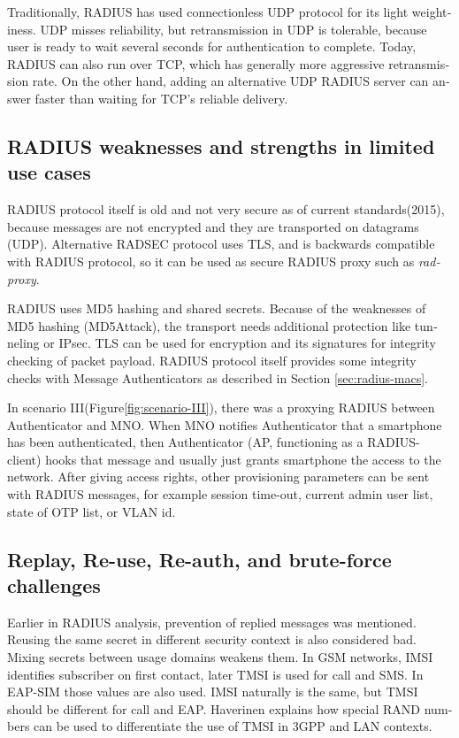 \documentclass[12pt,a4paper,english]{tutthesis}
\begin{document}
\begin{otherlanguage}{english}
Traditionally, RADIUS has used connection\-less UDP protocol for its
light weightiness. UDP misses reliability, but retransmission in UDP is
tolerable, because user is ready to wait several seconds for
authentication to complete. Today, RADIUS can also run over TCP, which
has generally more aggressive retransmission
rate\cite[Section 2.2.1]{rfc5080}. 
On the other hand, adding an
alternative UDP RADIUS server can answer faster than waiting for TCP's reliable delivery.


\subsection{RADIUS weaknesses and strengths in limited use cases}
\label{sec-6-5-4}


RADIUS protocol itself is old and not very secure as of current
standards(2015), because messages are not encrypted and they are
transported on datagrams (UDP). Alternative RADSEC protocol uses TLS, and 
is backwards compatible with RADIUS protocol, so it can be used
as secure RADIUS proxy such as \emph{radproxy}\cite{uninett-radproxy}.

RADIUS uses MD5 hashing and shared secrets. Because of the weaknesses of
MD5 hashing (MD5Attack\cite{rfc5176}), the transport needs additional
protection like tunneling or IPsec. TLS can be used for encryption and
its signatures for integrity checking of packet payload.
RADIUS protocol itself provides some integrity checks with Message
Authenticators as described in Section \ref{sec:radius-macs}.



In scenario III(Figure\ref{fig:scenario-III}),  there was a proxying RADIUS between Authenticator
and MNO.  When MNO notifies Authenticator
that a smartphone has been authenticated, then Authenticator (AP, functioning
as a RADIUS-client) hooks that message and usually just grants
smartphone the access to the network. After giving access rights, other
provisioning parameters can be sent with RADIUS messages, for example
session time-out,
current admin user list, state of OTP list, or VLAN id.


\subsection{Replay, Re-use, Re-auth, and brute-force challenges}
\label{sec-6-5-5}
Earlier in RADIUS analysis, prevention of replied messages was
mentioned. Reusing the same secret in different security context is also
considered bad.  Mixing secrets between usage
domains weakens them.  In GSM networks, IMSI identifies subscriber on
first contact, later TMSI is used for call and SMS.  In EAP-SIM those
values are also used. IMSI naturally is the same, but TMSI should be
different for call and EAP.  Haverinen\cite{hav-doc} explains how
special RAND numbers can be used to differentiate the use of TMSI in 3GPP and LAN
contexts.


\end{otherlanguage}
\end{document}

